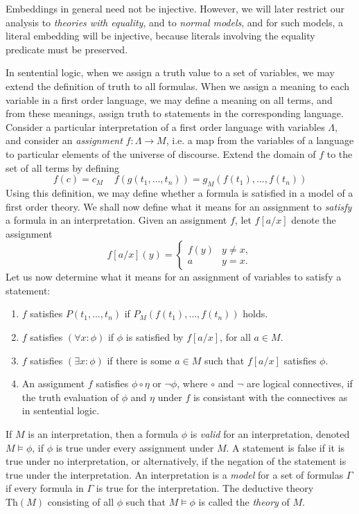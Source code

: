 \begin{remark}
    Embeddings in general need not be injective. However, we will later restrict our analysis to \emph{theories with equality}, and to \emph{normal models}, and for such models, a literal embedding will be injective, because literals involving the equality predicate must be preserved.
\end{remark}

In sentential logic, when we assign a truth value to a set of variables, we may extend the definition of truth to all formulas. When we assign a meaning to each variable in a first order language, we may define a meaning on all terms, and from these meanings, assign truth to statements in the corresponding language. Consider a particular interpretation of a first order language with variables $\Lambda$, and consider an \emph{assignment} $f: \Lambda \to M$, i.e. a map from the variables of a language to particular elements of the universe of discourse. Extend the domain of $f$ to the set of all terms by defining
%
\[ f(c) = c_M\ \ \ \ \ f(g(t_1, \dots, t_n)) = g_M(f(t_1), \dots, f(t_n)) \]
%
Using this definition, we may define whether a formula is satisfied in a model of a first order theory. We shall now define what it means for an assignment to \emph{satisfy} a formula in an interpretation. Given an assignment $f$, let $f[a/x]$ denote the assignment
%
\[ f[a/x](y) = \begin{cases} f(y) & y \neq x, \\ a & y = x. \end{cases} \]
%
Let us now determine what it means for an assignment of variables to satisfy a statement:
%
\begin{enumerate}
    \item $f$ satisfies $P(t_1, \dots, t_n)$ if $P_M(f(t_1), \dots, f(t_n))$ holds.
    \item $f$ satisfies $(\forall x: \phi)$ if $\phi$ is satisfied by $f[a/x]$, for all $a \in M$.
    \item $f$ satisfies $(\exists x: \phi)$ if there is some $a \in M$ such that $f[a/x]$ satisfies $\phi$.
    \item An assignment $f$ satisfies $\phi \circ \eta$ or $\neg \phi$, where $\circ$ and $\neg$ are logical connectives, if the truth evaluation of $\phi$ and $\eta$ under $f$ is consistant with the connectives as in sentential logic.
\end{enumerate}
%
If $M$ is an interpretation, then a formula $\phi$ is \emph{valid} for an interpretation, denoted $M \vDash \phi$, if $\phi$ is true under every assignment under $M$. A statement is false if it is true under no interpretation, or alternatively, if the negation of the statement is true under the interpretation. An interpretation is a \emph{model} for a set of formulas $\Gamma$ if every formula in $\Gamma$ is true for the interpretation. The deductive theory $\text{Th}(M)$ consisting of all $\phi$ such that $M \vDash \phi$ is called the \emph{theory} of $M$.

